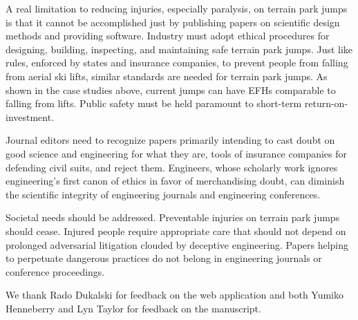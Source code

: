 \documentclass[smallextended]{svjour3}       %
\begin{document}
A real limitation to reducing injuries, especially paralysis, on terrain park
jumps is that it cannot be accomplished just by publishing papers on scientific
design methods and providing software. Industry must adopt ethical procedures
for designing, building, inspecting, and maintaining safe terrain park jumps.
Just like rules, enforced by states and insurance companies, to prevent people
from falling from aerial ski lifts, similar standards are needed for terrain park
jumps. As shown in the case studies above, current jumps can have EFHs comparable to falling from lifts. Public safety
must be held paramount to short-term return-on-investment.

Journal editors need to recognize papers primarily intending to cast doubt on
good science and engineering for what they are, tools of insurance companies
for defending civil suits, and reject them. Engineers, whose scholarly work
ignores engineering's first canon of ethics in favor of merchandising doubt,
can diminish the scientific integrity of engineering journals and
engineering conferences.

Societal needs should be addressed. Preventable injuries on terrain park jumps
should cease. Injured people require appropriate care that should not depend on
prolonged adversarial litigation clouded by deceptive engineering. Papers
helping to perpetuate dangerous practices do not belong in engineering journals
or conference proceedings.


\begin{acknowledgements}
  We thank Rado Dukalski for feedback on the web application and both Yumiko
  Henneberry and Lyn Taylor for feedback on the manuscript.
\end{acknowledgements}
\end{document}
